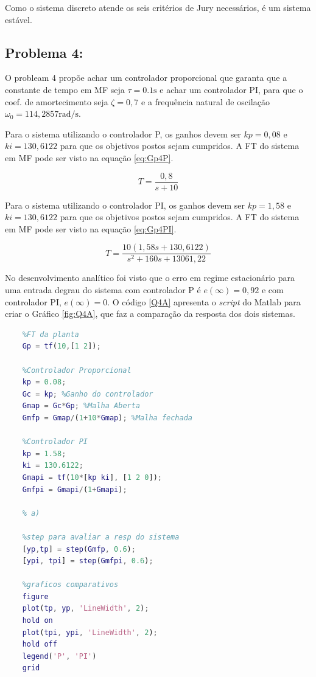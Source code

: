     Como o sistema discreto atende os seis critérios de Jury necessários, é um sistema estável.    

\newpage    
\subsection*{Problema 4:}

 O probleam 4 propõe achar um controlador proporcional que garanta que a constante de tempo em MF seja $\tau = 0.1\text{s}$ 
 e achar um controlador PI, para que o coef. de amortecimento seja $\zeta = 0,7$ e a frequência natural de oscilação 
 $\omega_0 = 114,2857 \text{rad/s}$. 

 Para o sistema utilizando o controlador P, os ganhos devem ser $kp = 0,08$ e $ki = 130,6122$ para que os 
 objetivos postos sejam cumpridos. A FT do sistema em MF pode ser visto na equação \ref{eq:Gp4P}.
   
 \begin{equation}
    T =  \frac{0,8}{s+10}
    \label{eq:Gp4P}
\end{equation}
 
 Para o sistema utilizando o controlador PI, os ganhos devem ser $kp = 1,58$ e $ki = 130,6122$ para que os 
 objetivos postos sejam cumpridos. A FT do sistema em MF pode ser visto na equação \ref{eq:Gp4PI}.

    \begin{equation}
        T =  \frac{10(1,58s+130,6122)}{s^2+160s+13061,22}
        \label{eq:Gp4PI}
    \end{equation}

No desenvolvimento analítico foi visto que o erro em regime estacionário para uma entrada degrau do sistema
com controlador P é $e(\infty) = 0,92$ e com controlador PI, $e(\infty) = 0$.
O código \ref{Q4A} apresenta o \textit{script} do Matlab para criar o Gráfico \ref{fig:Q4A}, que faz a comparação da resposta
dos dois sistemas.

\begin{lstlisting}[language=Matlab,label=Q4A,caption=Análise da estabilidade]
    % a)
    %FT da planta
    Gp = tf(10,[1 2]); 
    
    %Controlador Proporcional
    kp = 0.08;
    Gc = kp; %Ganho do controlador
    Gmap = Gc*Gp; %Malha Aberta
    Gmfp = Gmap/(1+10*Gmap); %Malha fechada
    
    %Controlador PI
    kp = 1.58; 
    ki = 130.6122;
    Gmapi = tf(10*[kp ki], [1 2 0]);
    Gmfpi = Gmapi/(1+Gmapi);
    
    % a)
    
    %step para avaliar a resp do sistema
    [yp,tp] = step(Gmfp, 0.6);
    [ypi, tpi] = step(Gmfpi, 0.6);
    
    %graficos comparativos
    figure
    plot(tp, yp, 'LineWidth', 2);
    hold on
    plot(tpi, ypi, 'LineWidth', 2);
    hold off
    legend('P', 'PI')
    grid
\end{lstlisting}


